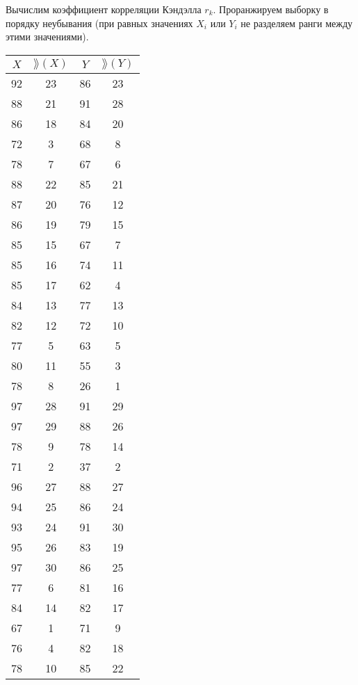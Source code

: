 \documentclass[utf8, a4paper, 14pt, russian, oneside]{book}
\begin{document}
Вычислим коэффициент корреляции Кэндэлла $r_k$. Проранжируем выборку в порядку неубывания (при равных значениях $X_i$ или $Y_i$ не разделяем ранги между этими значениями).
\begin{table}[h!]
    \small
    \centering
    \begin{tabular}{|c|c|c|c|}
        \hline 
        $X$ & $\rang(X)$ & $Y$ & $\rang(Y)$ \\ \hline
        92 & 23 & 86 & 23 \\ \hline   
        88 & 21 & 91 & 28 \\ \hline   
        86 & 18 & 84 & 20 \\ \hline   
        72 &  3 & 68 &  8 \\ \hline   
        78 &  7 & 67 &  6 \\ \hline   
        88 & 22 & 85 & 21 \\ \hline   
        87 & 20 & 76 & 12 \\ \hline   
        86 & 19 & 79 & 15 \\ \hline   
        85 & 15 & 67 &  7 \\ \hline   
        85 & 16 & 74 & 11 \\ \hline   
        85 & 17 & 62 &  4 \\ \hline   
        84 & 13 & 77 & 13 \\ \hline   
        82 & 12 & 72 & 10 \\ \hline   
        77 &  5 & 63 &  5 \\ \hline   
        80 & 11 & 55 &  3 \\ \hline   
        78 &  8 & 26 &  1 \\ \hline   
        97 & 28 & 91 & 29 \\ \hline   
        97 & 29 & 88 & 26 \\ \hline   
        78 &  9 & 78 & 14 \\ \hline   
        71 &  2 & 37 &  2 \\ \hline   
        96 & 27 & 88 & 27 \\ \hline   
        94 & 25 & 86 & 24 \\ \hline   
        93 & 24 & 91 & 30 \\ \hline   
        95 & 26 & 83 & 19 \\ \hline   
        97 & 30 & 86 & 25 \\ \hline   
        77 &  6 & 81 & 16 \\ \hline   
        84 & 14 & 82 & 17 \\ \hline   
        67 &  1 & 71 &  9 \\ \hline   
        76 &  4 & 82 & 18 \\ \hline  
        78 & 10 & 85 & 22 \\ \hline  
    \end{tabular}
\end{table}
\newpage
\end{document}
